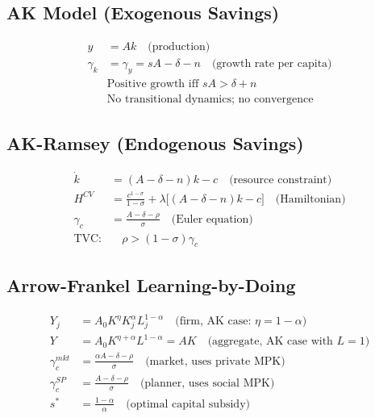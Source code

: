 \documentclass[a4paper,11pt]{article}
\begin{document}
\subsection*{AK Model (Exogenous Savings)}
\begin{align*}
y &= Ak \quad \text{(production)} \\
\gamma_k &= \gamma_y = sA - \delta - n \quad \text{(growth rate per capita)} \\
&\text{Positive growth iff } sA > \delta + n \\
&\text{No transitional dynamics; no convergence}
\end{align*}

\subsection*{AK-Ramsey (Endogenous Savings)}
\begin{align*}
\dot{k} &= (A - \delta - n)k - c \quad \text{(resource constraint)} \\
H^{CV} &= \frac{c^{1-\sigma}}{1-\sigma} + \lambda\bigl[(A-\delta-n)k - c\bigr] \quad \text{(Hamiltonian)} \\
\gamma_c &= \frac{A - \delta - \rho}{\sigma} \quad \text{(Euler equation)} \\
\text{TVC:} &\quad \rho > (1-\sigma)\gamma_c
\end{align*}

\subsection*{Arrow-Frankel Learning-by-Doing}
\begin{align*}
Y_j &= A_0 K^\eta K_j^\alpha L_j^{1-\alpha} \quad \text{(firm, AK case: } \eta = 1-\alpha\text{)} \\
Y &= A_0 K^{\eta+\alpha} L^{1-\alpha} = AK \quad \text{(aggregate, AK case with } L=1\text{)} \\
\gamma_c^{mkt} &= \frac{\alpha A - \delta - \rho}{\sigma} \quad \text{(market, uses private MPK)} \\
\gamma_c^{SP} &= \frac{A - \delta - \rho}{\sigma} \quad \text{(planner, uses social MPK)} \\
s^* &= \frac{1-\alpha}{\alpha} \quad \text{(optimal capital subsidy)}
\end{align*}
\end{document}
